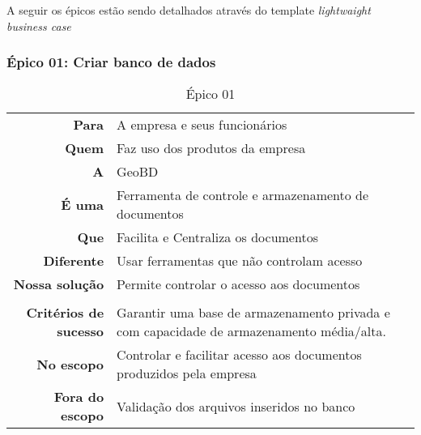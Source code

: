   A seguir os épicos estão sendo detalhados através do template \textit{lightwaight business case}

\subsubsection{Épico 01: Criar banco de dados}

  \begin{table}[!htb]
    \centering
    \begin{tabular}{rp{10cm}}                    \hline
      \rowcolor{gray!50}
      \multicolumn{2}{c}{Criação de Banco de Dados} \\ \hline
      \textbf{Para}                 & A empresa e seus funcionários                                                             \\
      \textbf{Quem}                 & Faz uso dos produtos da empresa                                                           \\
      \textbf{A}                    & GeoBD                                                                                     \\
      \textbf{É uma}                & Ferramenta de controle e armazenamento de documentos                                      \\
      \textbf{Que}                  & Facilita e Centraliza os documentos                                                       \\
      \textbf{Diferente}            & Usar ferramentas que não controlam acesso                                                 \\
      \textbf{Nossa solução}        & Permite controlar o acesso aos documentos                                                 \\
      \rowcolor{gray!50} \hline
      \multicolumn{2}{c}{Escopo}                    \\ \hline
      \textbf{Critérios de sucesso} & Garantir uma base de armazenamento privada e com capacidade de armazenamento média/alta.  \\
      \textbf{No escopo}            & Controlar e facilitar acesso aos documentos produzidos pela empresa                       \\
      \textbf{Fora do escopo}       & Validação dos arquivos inseridos no banco
    \end{tabular}
    \caption{Épico 01}
  \end{table}


